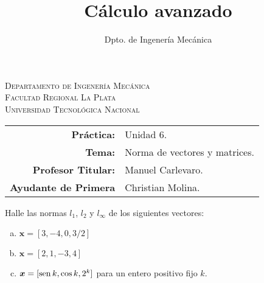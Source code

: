 \documentclass[11pt]{article}
\title{Cálculo avanzado}
\author{Dpto. de Ingenería Mecánica}
\begin{document}

\begin{center}
\end{center} 

\begin{center}
\vspace{\baselineskip}
\Large{\textsc{Departamento de Ingenería Mecánica}} \\
\textsc{Facultad Regional La Plata} \\
\textsc{Universidad Tecnológica Nacional}
\end{center}


\begin{center}
\begin{tabular}{r l}
    \textbf{Práctica:} & Unidad 6. \\
 \textbf{Tema:} & Norma de vectores y matrices. \\
 \textbf{Profesor Titular:} & Manuel Carlevaro. \\
 \textbf{Ayudante de Primera} & Christian Molina. \\
\end{tabular}\end{center}

\vspace{1em}

\begin{question} %
    Halle las normas $l_1$, $l_2$ y $l_{\infty}$ de los siguientes vectores:
    \begin{enumerate}[a)]
    \item $\bm{x} = [3, -4, 0, 3/2]$
    \item $\bm{x} = [2, 1, -3, 4]$
    \item $\bm{x} = [\operatorname{sen} k, \cos k, 2^k]$ para un entero positivo fijo $k$.
    \end{enumerate}
\end{question}
\end{document}
